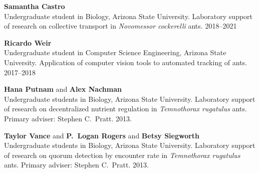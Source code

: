 \documentclass[10pt]{article}           %
\begin{document}
\begin{cvlist}[loose]


    \item \textbf{Samantha Castro}\\
        Undergraduate student in Biology, Arizona State University.
        Laboratory support of research on collective transport in
        \emph{Novomessor cockerelli} ants.
        2018--2021

    \item \textbf{Ricardo Weir}\\
        Undergraduate student in Computer Science Engineering, Arizona State University.
        Application of computer vision tools to automated tracking of
        ants.
        2017--2018

    \item \textbf{Hana Putnam} and \textbf{Alex Nachman}\\
        Undergraduate students in Biology, Arizona State University.
        Laboratory support of research on decentralized nutrient
        regulation in \emph{Temnothorax rugatulus} ants.
        Primary adviser: Stephen C.~Pratt.
        2013.

    \item \textbf{Taylor Vance} and \textbf{P.~Logan Rogers}
        and \textbf{Betsy Siegworth}\\
        Undergraduate students in Biology, Arizona State University.
        Laboratory support of research on quorum detection by encounter
        rate in \emph{Temnothorax rugatulus} ants.
        Primary adviser: Stephen C.~Pratt.
        2013.





\end{cvlist}
\end{document}
